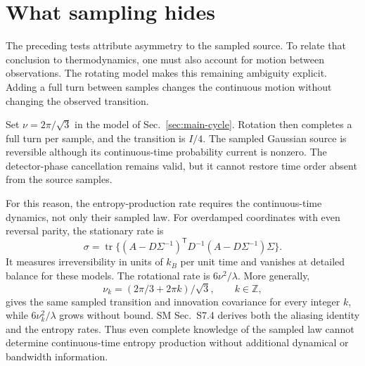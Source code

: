 \section{What sampling hides}\label{sec:sampling}
The preceding tests attribute asymmetry to the sampled source. To relate that conclusion to thermodynamics, one must also account for motion between observations. The rotating model makes this remaining ambiguity explicit. Adding a full turn between samples changes the continuous motion without changing the observed transition.

Set $\nu=2\pi/\sqrt3$ in the model of Sec.~\ref{sec:main-cycle}. Rotation then completes a full turn per sample, and the transition is $I/4$. The sampled Gaussian source is reversible although its continuous-time probability current is nonzero. The detector-phase cancellation remains valid, but it cannot restore time order absent from the source samples.

For this reason, the entropy-production rate requires the continuous-time dynamics, not only their sampled law. For overdamped coordinates with even reversal parity, the stationary rate is~\cite{seifert2012}
\begin{equation}
 \sigma=\operatorname{tr}\{(A-D\Sigma^{-1})^{\mathsf T}
 D^{-1}(A-D\Sigma^{-1})\Sigma\}.
\end{equation}
It measures irreversibility in units of $k_B$ per unit time and vanishes at detailed balance for these models. The rotational rate is $6\nu^2/\lambda$. More generally,
\begin{equation}
 \nu_k=(2\pi/3+2\pi k)/\sqrt3,\qquad k\in\mathbb Z,
\end{equation}
gives the same sampled transition and innovation covariance for every integer $k$, while $6\nu_k^2/\lambda$ grows without bound. SM Sec.~S7.4 derives both the aliasing identity and the entropy rates. Thus even complete knowledge of the sampled law cannot determine continuous-time entropy production without additional dynamical or bandwidth information.
